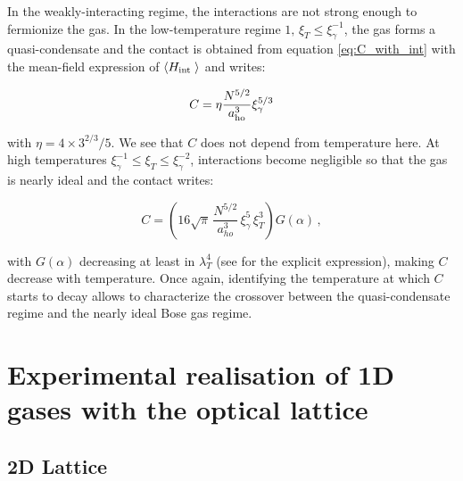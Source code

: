 In the weakly-interacting regime, the interactions are not strong enough to fermionize the gas. In the low-temperature regime $1, \, \xi_T \leq \xi_\gamma^{-1}$, the gas forms a quasi-condensate and the contact is obtained from equation \ref{eq:C_with_int} with the mean-field expression of $\langle H_{\text {int }}\rangle$ and writes:

\begin{equation}
    C = \eta \frac{N^{5/2}}{a_{\rm{ho}}^3} \xi_\gamma^{5/3} 
    \label{eq:weak_int_lowT}
\end{equation}

\noindent with $\eta = 4 \times 3^{2/3}/5$. We see that $C$ does not depend from temperature here. At high temperatures $\xi_\gamma^{-1} \leq \xi_T \leq \xi_\gamma^{-2}$, interactions become negligible so that the gas is nearly ideal and the contact writes:

\begin{equation}
    C = \left( 16 \sqrt{\pi} \, \frac{N^{5/2}}{a_{ho}^3} \, \xi_\gamma^5 \, \xi_T^3 \right) G(\alpha) \, ,
    \label{eq:weak_int_highT}
\end{equation}

\noindent with $G(\alpha)$ decreasing at least in $\lambda_T^4$ (see \cite{yao2018tan} for the explicit expression), making $C$ decrease with temperature. Once again, identifying the temperature at which $C$ starts to decay allows to characterize the crossover between the quasi-condensate regime and the nearly ideal Bose gas regime.

\section{Experimental realisation of 1D gases with the optical lattice}

\label{sec:1D_exp}

\subsection{2D Lattice}

